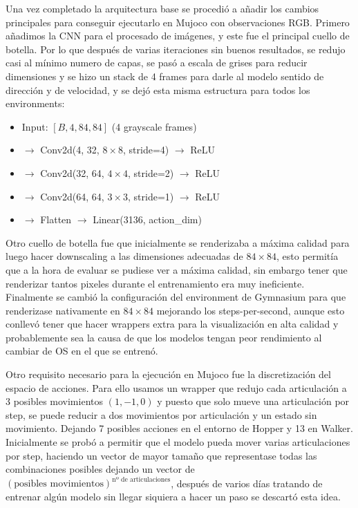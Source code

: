 \documentclass[onecolumn]{cwpreport} %
\begin{document}
Una vez completado la arquitectura base se procedió a añadir los cambios principales para conseguir ejecutarlo en Mujoco con observaciones RGB. Primero añadimos la CNN para el procesado de imágenes, y este fue el principal cuello de botella. Por lo que después de varias iteraciones sin buenos resultados, se redujo casi al mínimo numero de capas, se pasó a escala de grises para reducir dimensiones y se hizo un stack de 4 frames para darle al modelo sentido de dirección y de velocidad, y se dejó esta misma estructura para todos los environments:

\begin{itemize}
    \item[] Input: $[B, 4, 84, 84]$ (4 grayscale frames)
    \item[] $\rightarrow$ Conv2d(4, 32, $8\times8$, stride=4) $\rightarrow$ ReLU
    \item[] $\rightarrow$ Conv2d(32, 64, $4\times4$, stride=2) $\rightarrow$ ReLU
    \item[] $\rightarrow$ Conv2d(64, 64, $3\times3$, stride=1) $\rightarrow$ ReLU
    \item[] $\rightarrow$ Flatten $\rightarrow$ Linear(3136, action\_dim)
\end{itemize}

Otro cuello de botella fue que inicialmente se renderizaba a máxima calidad para luego hacer downscaling a las dimensiones adecuadas de $84\times84$, esto permitía que a la hora de evaluar se pudiese ver a máxima calidad, sin embargo tener que renderizar tantos pixeles durante el entrenamiento era muy ineficiente. Finalmente se cambió la configuración del environment de Gymnasium para que renderizase nativamente en $84\times84$ mejorando los steps-per-second, aunque esto conllevó tener que hacer wrappers extra para la visualización en alta calidad y probablemente sea la causa de que los modelos tengan peor rendimiento al cambiar de OS en el que se entrenó.

Otro requisito necesario para la ejecución en Mujoco fue la discretización del espacio de acciones. Para ello usamos un wrapper que redujo cada articulación a 3 posibles movimientos $(1, -1, 0)$ y puesto que solo mueve una articulación por step, se puede reducir a dos movimientos por articulación y un estado sin movimiento. Dejando 7 posibles acciones en el entorno de Hopper y 13 en Walker. Inicialmente se probó a permitir que el modelo pueda mover varias articulaciones por step, haciendo un vector de mayor tamaño que representase todas las combinaciones posibles dejando un vector de $(\text{posibles movimientos})^{\text{nº de articulaciones}}$, después de varios días tratando de entrenar algún modelo sin llegar siquiera a hacer un paso se descartó esta idea.
\end{document}
